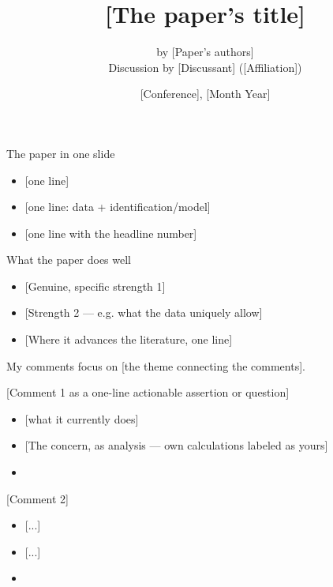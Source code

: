 \documentclass[11pt, aspectratio=169]{beamer}
\title{[The paper's title]}
\author{by [Paper's authors]\\[1.2em]
        Discussion by [Discussant] ([Affiliation])}
\date{[Conference], [Month Year]}
\begin{document}
\begin{frame}[plain]
  \titlepage
\end{frame}
\addtocounter{framenumber}{-1}

\begin{frame}[t]{The paper in one slide}
  \medskip
  \begin{itemize}
    \item[]  [one line]
    \item[]  [one line: data + identification/model]
    \item[]  [one line with the headline number]  %
  \end{itemize}
\end{frame}

\begin{frame}[t]{What the paper does well}
  \medskip
  \begin{itemize}
    \item {[Genuine, specific strength 1]}
    \item {[Strength 2 — e.g. what the data uniquely allow]}
    \item {[Where it advances the literature, one line]}
  \end{itemize}
  \medskip
  My comments focus on [the theme connecting the comments].
\end{frame}

\begin{frame}[t]{[Comment 1 as a one-line actionable assertion or question]}
  \medskip
  \begin{itemize}
    \item {} [what it currently does]  %
    \item {[The concern, as analysis — own calculations labeled as yours]}
    \item[$\Rightarrow$] [Concrete suggestion the authors can act on]
  \end{itemize}
\end{frame}

\begin{frame}[t]{[Comment 2]}
  \medskip
  \begin{itemize}
    \item {} [...]
    \item {[...]}
    \item[$\Rightarrow$] [...]
  \end{itemize}
\end{frame}
\end{document}
